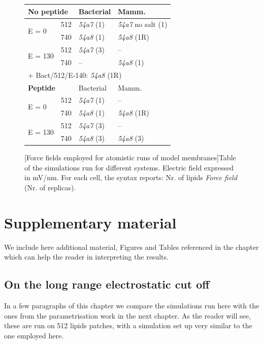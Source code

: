 \begin{figure}[h]%
\centering
 \def\arraystretch{1.6}
\begin{tabular}{ll|l|l}
\hline
 \multicolumn{2}{l|}{\textbf{No peptide}} & Bacterial & Mamm. \\
 \hline
 \multirow{2}{*}{E = 0} & 512 & \emph{54a7} (1) & \emph{54a7} no salt (1) \\
 & 740 & \emph{54a8} (1) & \emph{54a8} (1R) \\
 \hline
 \multirow{2}{*}{E = 130} & 512 & \emph{54a7} (3) & -- \\
 & 740 & -- & \emph{54a8} (1) \\
 \hline
 \multicolumn{4}{l}{+ Bact/512/E-140: \emph{54a8} (1R)} \\
 \hline
 \multicolumn{2}{l|}{\textbf{Peptide}} & Bacterial & Mamm. \\
 \hline
 \multirow{2}{*}{E = 0} & 512 & \emph{54a7} (1) & -- \\
 & 740 & \emph{54a8} (1) & \emph{54a8} (1R) \\
 \hline
 \multirow{2}{*}{E = 130} & 512 & \emph{54a7} (3) & -- \\
 & 740 & \emph{54a8} (3) & \emph{54a8} (3) \\
 \hline
 \end{tabular}
[Force fields employed for atomistic runs of model membranes]{Table of the simulations run for different systems. Electric field expressed in mV/nm. For each cell, the syntax reports: Nr. of lipids \emph{Force field} (Nr. of replicas).}
\label{table:membrane_simulations_force_field}
\end{figure}


\section{Supplementary material} \label{sec:ch3_SI}

We include here additional material, Figures and Tables referenced in the chapter which can help the reader in interpreting the results.


\subsection{On the long range electrostatic cut off}
In a few paragraphs of this chapter we compare the simulations run here with the ones from the parametrisation work in the next chapter. As the reader will see, these are run on 512 lipids patches, with a simulation set up very similar to the one employed here.

